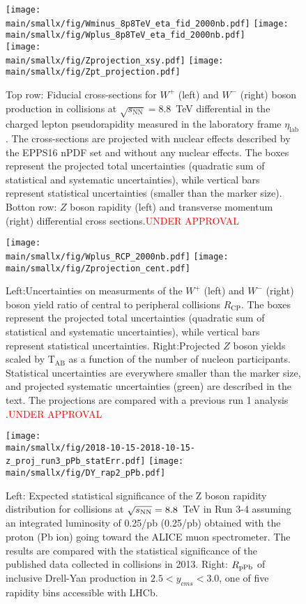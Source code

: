 \documentclass[../report.tex]{subfiles}
\providecommand{\main}{..}
\begin{document}
\begin{figure}
\centering
\texttt{[image: \\main/smallx/fig/Wminus\_8p8TeV\_eta\_fid\_2000nb.pdf]}
\texttt{[image: \\main/smallx/fig/Wplus\_8p8TeV\_eta\_fid\_2000nb.pdf]}\\
\texttt{[image: \\main/smallx/fig/Zprojection\_xsy.pdf]}
\texttt{[image: \\main/smallx/fig/Zpt\_projection.pdf]}
\caption{Top row: Fiducial cross-sections for $W^+$ (left) and $W^-$ (right) boson production in \pPb collisions at $\sqrt{s_\mathrm{NN}}=8.8$~TeV differential in the charged lepton pseudorapidity measured in the laboratory frame $\eta_\mathrm{lab}$. The cross-sections are projected with nuclear effects described by the EPPS16 nPDF set and without any nuclear effects. The boxes represent the projected total uncertainties (quadratic sum of statistical and systematic uncertainties), while vertical bars represent statistical uncertainties (smaller than the marker size).
Botton row: $Z$ boson rapidity (left) and transverse momentum (right) differential cross sections.\textcolor{red}{UNDER APPROVAL}}
\label{fig:ATLASWZxsection}
\texttt{[image: \\main/smallx/fig/Wplus\_RCP\_2000nb.pdf]}
\texttt{[image: \\main/smallx/fig/Zprojection\_cent.pdf]}
\caption{Left:Uncertainties on measurments of the $W^+$ (left) and $W^-$ (right) boson yield ratio of central to peripheral collisions $R_\mathrm{CP}$.  The boxes represent the projected total uncertainties (quadratic sum of statistical and systematic uncertainties), while vertical bars represent statistical uncertainties.  Right:Projected $Z$ boson yields scaled by T$_{\mathrm{AB}}$ as a function of the number of nucleon participants.  Statistical uncertainties are everywhere smaller than the marker size, and projected systematic uncertainties (green) are described in the text.  The projections are compared with a previous run 1 analysis  \cite{Aad:2015gta}.\textcolor{red}{UNDER APPROVAL}}
\label{fig:ATLASWZcent} 
\end{figure}


\begin{figure}[htb]
\centering
\texttt{[image: \\main/smallx/fig/2018-10-15-2018-10-15-z\_proj\_run3\_pPb\_statErr.pdf]}
\texttt{[image: \\main/smallx/fig/DY\_rap2\_pPb.pdf]}
\caption{Left: Expected statistical significance of the Z boson rapidity distribution for \pPb collisions at $\sqrt{s_{\rm NN}} = 8.8$~TeV in Run 3-4 assuming an integrated luminosity of 0.25/pb (0.25/pb) obtained with the proton (Pb ion) going toward the ALICE muon spectrometer. %
The results are compared with the statistical significance of the published data collected in \pPb collisions in 2013. Right: $R_{\rm pPb}$ of inclusive Drell-Yan production in $2.5<y_{cms}<3.0$, one of five rapidity bins accessible with LHCb.  %
}
\label{fig:plotDY}
\end{figure}
\end{document}
